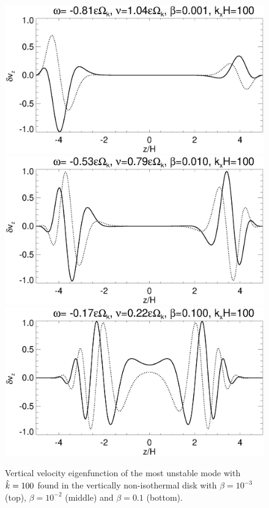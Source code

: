 \begin{figure}
  \includegraphics[width=\linewidth,clip=true,trim=0cm 1.73cm 0cm
  0cm]{figures/eigenvectorvz_vnoniso_kx100_beta0d001.ps}
  \includegraphics[width=\linewidth,clip=true,trim=0cm 1.73cm 0cm
  0cm]{figures/eigenvectorvz_vnoniso_kx100_beta0d01.ps}
  \includegraphics[width=\linewidth,clip=true,trim=0cm 0cm 0cm
  0cm]{figures/eigenvectorvz_vnoniso_kx100_beta0d1.ps}
  \caption{Vertical velocity eigenfunction of the most unstable mode
    with $\hat{k}=100$ found in the vertically non-isothermal disk with
    $\beta = 10^{-3}$ (top), $\beta=10^{-2}$ (middle) and $\beta=0.1$
    (bottom). 
    \label{compare_eigenvz_vnoniso_kx100}}
\end{figure}
  
